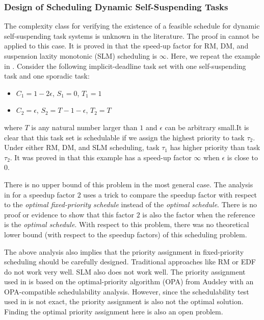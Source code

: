 \subsubsection{Design of Scheduling Dynamic Self-Suspending Tasks}
The complexity class for verifying the existence of a feasible schedule for dynamic self-suspending task systems is unknown in the literature. The proof in \cite{Ridouard_2004} cannot be applied to this case. 
It is proved in \cite{huangpass:dac2015} that the speed-up factor for RM, DM, and suspension laxity monotonic (SLM) scheduling is $\infty$. Here, we repeat the example in \cite{huangpass:dac2015}. Consider the following implicit-deadline task set with one self-suspending task and one sporadic task:
\begin{itemize}
 \setlength\itemsep{0em}
\item $C_1=1-2\epsilon$, $S_1=0$, $T_1=1$
\item  $C_2=\epsilon$, $S_2=T-1-\epsilon$, $T_2=T$
\end{itemize}
where $T$ is any natural number larger than $1$ and $\epsilon$ can be arbitrary small.It is clear that this task set is schedulable if we assign the highest priority to
task $\tau_2$. Under either RM, DM, and SLM scheduling, task $\tau_1$ has higher priority than task $\tau_2$. It was proved in \cite{huangpass:dac2015} that this example has a speed-up factor $\infty$ when $\epsilon$ is close to $0$.

There is no upper bound of this problem in the most general case. The analysis in \cite{huangpass:dac2015} for a speedup factor $2$ uses a trick to compare the speedup factor with respect to the \emph{optimal fixed-priority schedule} instead of the \emph{optimal schedule}. There is no proof or evidence to show that this factor $2$ is also the factor when the reference is the \emph{optimal schedule}. With respect to this problem, there was no theoretical lower bound (with respect to the speedup factors) of this scheduling problem. 


The above analysis also implies that the priority assignment in fixed-priority scheduling should be carefully designed. Traditional approaches like RM or EDF do not work very well. SLM also does not work well. The priority assignment used in \cite{huangpass:dac2015} is based on the optimal-priority algorithm (OPA) from Audsley \cite{audsley-1993} with an OPA-compatible schedulability analysis. However, since the schedulability test used in \cite{huangpass:dac2015}  is not exact, the priority assignment is also not the optimal solution.
Finding the optimal priority assignment here is also an open problem.


